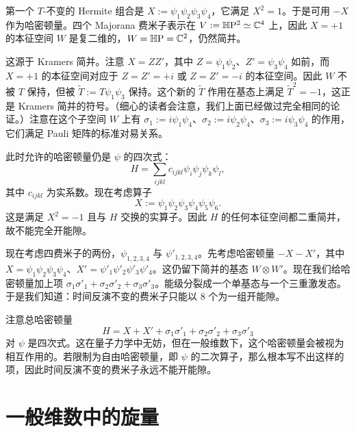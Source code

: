 第一个 $T$-不变的 Hermite 组合是 $X:=\psi_1\psi_2\psi_3\psi_4$，它满足 $X^2=1$。于是可用 $-X$ 作为哈密顿量。四个 Majorana 费米子表示在 $V:=\mathbb{H}\mathrm{P}^2\simeq\mathbb{C}^4$ 上，因此 $X=+1$ 的本征空间 $W$ 是复二维的，$W=\mathbb{H}\mathrm{P}=\mathbb{C}^2$，仍然简并。

这源于 Kramers 简并。注意 $X=ZZ'$，其中 $Z=\psi_1\psi_2$、$Z'=\psi_3\psi_4$ 如前，而 $X=+1$ 的本征空间对应于 $Z=Z'=+i$ 或 $Z=Z'=-i$ 的本征空间。因此 $W$ 不被 $T$ 保持，但被 $\tilde T:=T\psi_1\psi_3$ 保持。这个新的 $\tilde T$ 作用在基态上满足 $\tilde T^2=-1$，这正是 Kramers 简并的符号。（细心的读者会注意，我们上面已经做过完全相同的论证。）注意在这个子空间 $W$ 上有 $\sigma_1:=i\psi_1\psi_4$、$\sigma_2:=i\psi_2\psi_4$、$\sigma_3:=i\psi_3\psi_4$ 的作用，它们满足 Pauli 矩阵的标准对易关系。

此时允许的哈密顿量仍是 $\psi$ 的四次式：
\begin{equation}
  H=\sum_{ijkl}c_{ijkl}\psi_i\psi_j\psi_k\psi_l,
  \tag{10.32}
\end{equation}
其中 $c_{ijkl}$ 为实系数。现在考虑算子
\begin{equation}
  X:=\psi_1\psi_2\psi_3\psi_4\psi_5\psi_6.
  \tag{10.33}
\end{equation}
这是满足 $X^2=-1$ 且与 $H$ 交换的实算子。因此 $H$ 的任何本征空间都二重简并，故不能完全开能隙。

现在考虑四费米子的两份，$\psi_{1,2,3,4}$ 与 $\psi'_{1,2,3,4}$。先考虑哈密顿量 $-X-X'$，其中 $X=\psi_1\psi_2\psi_3\psi_4$、$X'=\psi'_1\psi'_2\psi'_3\psi'_4$。这仍留下简并的基态 $W\otimes W'$。现在我们给哈密顿量加上项 $\sigma_1\sigma'_1+\sigma_2\sigma'_2+\sigma_3\sigma'_3$。能级分裂成一个单基态与一个三重激发态。于是我们知道：时间反演不变的费米子只能以 8 个为一组开能隙。

注意总哈密顿量
\begin{equation}
  H=X+X'+\sigma_1\sigma'_1+\sigma_2\sigma'_2+\sigma_3\sigma'_3
  \tag{10.34}
\end{equation}
对 $\psi$ 是四次式。这在量子力学中无妨，但在一般维数下，这个哈密顿量会被视为相互作用的。若限制为自由哈密顿量，即 $\psi$ 的二次算子，那么根本写不出这样的项，因此时间反演不变的费米子永远不能开能隙。


\section{一般维数中的旋量}

